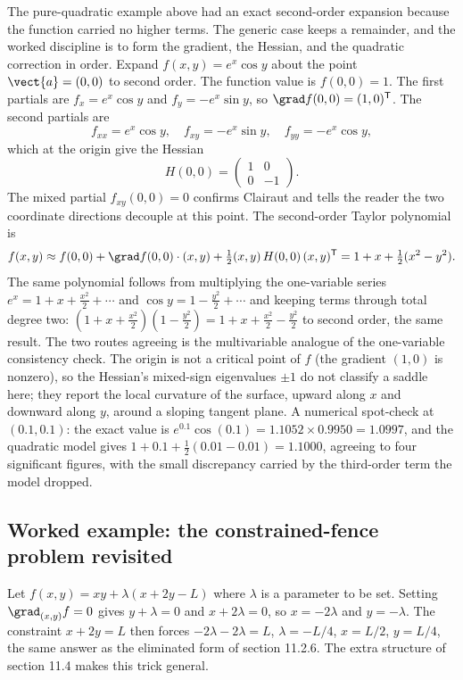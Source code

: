 The pure-quadratic example above had an exact second-order
expansion because the function carried no higher terms. The
generic case keeps a remainder, and the worked discipline is to
form the gradient, the Hessian, and the quadratic correction in
order. Expand $f(x, y) = e^{x}\cos y$ about the point $\vect{a} =
(0, 0)$ to second order. The function value is $f(0, 0) = 1$. The
first partials are $f_{x} = e^{x}\cos y$ and $f_{y} = -e^{x}\sin y$,
so $\grad f(0, 0) = (1, 0)^{\mathsf{T}}$. The second partials are
\[
f_{xx} = e^{x}\cos y, \quad
f_{xy} = -e^{x}\sin y, \quad
f_{yy} = -e^{x}\cos y,
\]
which at the origin give the Hessian
\[
H(0, 0) = \begin{pmatrix} 1 & 0 \\ 0 & -1 \end{pmatrix}.
\]
The mixed partial $f_{xy}(0,0) = 0$ confirms Clairaut and tells the
reader the two coordinate directions decouple at this point. The
second-order Taylor polynomial is
\[
f(x, y) \approx f(0, 0) + \grad f(0, 0)\cdot(x, y) +
\tfrac{1}{2}(x, y)\,H(0, 0)\,(x, y)^{\mathsf{T}}
= 1 + x + \tfrac{1}{2}(x^{2} - y^{2}).
\]
The same polynomial follows from multiplying the one-variable
series $e^{x} = 1 + x + \tfrac{x^{2}}{2} + \cdots$ and $\cos y =
1 - \tfrac{y^{2}}{2} + \cdots$ and keeping terms through total
degree two: $(1 + x + \tfrac{x^{2}}{2})(1 - \tfrac{y^{2}}{2}) =
1 + x + \tfrac{x^{2}}{2} - \tfrac{y^{2}}{2}$ to second order, the
same result. The two routes agreeing is the multivariable analogue
of the one-variable consistency check. The origin is not a critical
point of $f$ (the gradient $(1, 0)$ is nonzero), so the Hessian's
mixed-sign eigenvalues $\pm 1$ do not classify a saddle here; they
report the local curvature of the surface, upward along $x$ and
downward along $y$, around a sloping tangent plane. A numerical
spot-check at $(0.1, 0.1)$: the exact value is $e^{0.1}\cos(0.1) =
1.1052 \times 0.9950 = 1.0997$, and the quadratic model gives
$1 + 0.1 + \tfrac{1}{2}(0.01 - 0.01) = 1.1000$, agreeing to four
significant figures, with the small discrepancy carried by the
third-order term the model dropped.

\subsection{Worked example: the constrained-fence problem
revisited}

Let $f(x, y) = xy + \lambda(x + 2y - L)$ where $\lambda$ is a
parameter to be set. Setting $\grad_{(x, y)} f = 0$ gives
$y + \lambda = 0$ and $x + 2\lambda = 0$, so $x = -2\lambda$ and
$y = -\lambda$. The constraint $x + 2 y = L$ then forces
$-2\lambda - 2\lambda = L$, $\lambda = -L/4$, $x = L/2$, $y = L/4$,
the same answer as the eliminated form of section 11.2.6. The
extra structure of section 11.4 makes this trick general.

